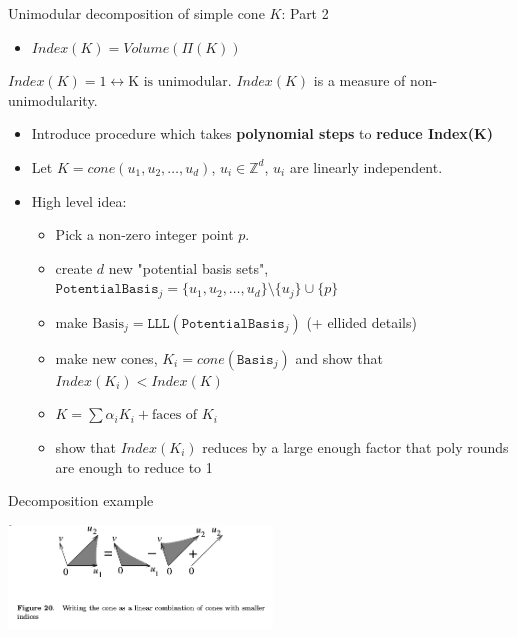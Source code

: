 \documentclass[8pt]{beamer}
\begin{document}
\begin{frame}[label=sec-14]{Unimodular decomposition of simple cone $K$: Part 2}
\begin{itemize}
\item $Index(K) = Volume(\Pi(K))$
\end{itemize}

$Index(K) = 1 \leftrightarrow \text{K is unimodular}$. $Index(K)$ is a measure of non-unimodularity.

\begin{itemize}
\item Introduce procedure which takes \textbf{polynomial steps} to \textbf{reduce Index(K)}
\item Let $K = cone(u_1, u_2, \ldots, u_d)$, $u_i \in \mathbb{Z}^d$, $u_i$ are linearly independent.
\item High level idea:
\begin{itemize}
\item Pick a non-zero integer point $p$.
\item create $d$ new "potential basis sets", $\texttt{PotentialBasis}_j = \{u_1, u_2 , \ldots, u_d\} \setminus \{u_j\} \cup \{p\}$
\item make $\text{Basis}_j = \texttt{LLL}(\texttt{PotentialBasis}_j)$  (+ ellided details)
\item make new cones, $K_i = cone(\texttt{Basis}_j)$ and show that $Index(K_i) < Index(K)$
\item $K = \sum \alpha_i K_i + \text{faces of \(K_i \)}$
\item show that $Index(K_i)$ reduces by a large enough factor that poly rounds are enough to reduce to 1
\end{itemize}
\end{itemize}
\end{frame}

\begin{frame}[label=sec-15]{Decomposition example}
\begin{center}
\includegraphics[width=7cm, keepaspectratio]{res/simple-cone-as-combination-smaller-indeces}
\end{center}
\end{frame}
\end{document}
